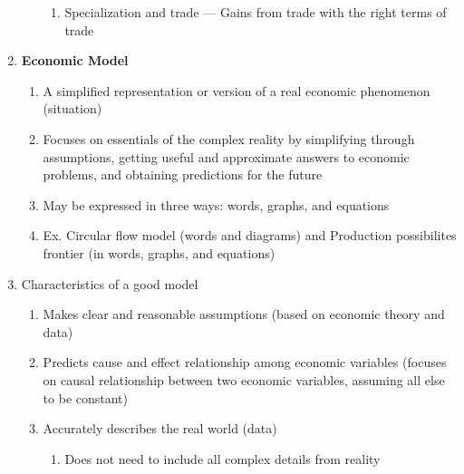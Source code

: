 \documentclass[12pt]{article}
\begin{document}
\begin{enumerate}
\begin{enumerate}
\begin{enumerate}
              \item Specialization and trade — Gains from trade with the right terms of trade

            \end{enumerate}

        \end{enumerate}

      \item \textbf{Economic Model}

        \begin{enumerate}

          \item A simplified representation or version of a real economic phenomenon (situation)

          \item Focuses on essentials of the complex reality by simplifying through assumptions, getting useful and approximate answers to economic problems, and obtaining predictions for the future

          \item May be expressed in three ways: words, graphs, and equations

          \item Ex. Circular flow model (words and diagrams) and Production possibilites frontier (in words, graphs, and equations)

        \end{enumerate}

      \item Characteristics of a good model

        \begin{enumerate}

          \item Makes clear and reasonable assumptions (based on economic theory and data)

          \item Predicts cause and effect relationship among economic variables (focuses on causal relationship between two economic variables, assuming all else to be constant)

          \item Accurately describes the real world (data)

            \begin{enumerate}

              \item Does not need to include all complex details from reality


\end{enumerate}
\end{enumerate}
\end{enumerate}
\end{document}
